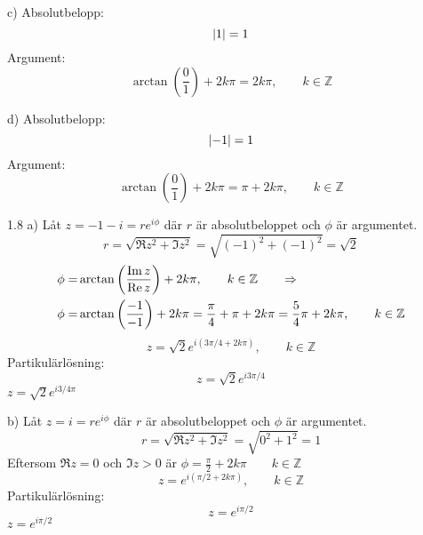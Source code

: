 \begin{task}{c)}
	Absolutbelopp:
	\[\left|1\right|=1\]
	Argument:
	\[\arctan\left(\frac{0}{1}\right)+2k\pi=2k\pi, \qquad k\in\mathbb{Z}\]
\end{task}

\begin{task}{d)}
	Absolutbelopp:
	\[\left|-1\right|=1\]
	Argument:
	\[\arctan\left(\frac{0}{1}\right)+2k\pi=\pi+2k\pi, \qquad k\in\mathbb{Z}\]
\end{task}

\begin{task}{1.8 a)}
	Låt $z = -1-i = re^{i\phi}$ där $r$ är absolutbeloppet och $\phi$ är argumentet.
	\[r=\sqrt{\Re z^2+\Im z^2}=
	\sqrt{(-1)^2+(-1)^2}=
	\sqrt{2}\]
	\begin{align*}
		\phi=&\arctan\left(\frac{\operatorname{Im} z}{\operatorname{Re} z}\right)+2k\pi, \qquad k \in \mathbb{Z} \qquad \operatorname{\Rightarrow} \\
		\phi=&\arctan\left(\frac{-1}{-1}\right)+2k\pi=
		\frac{\pi}{4}+\pi+2k\pi=
		\frac{5}{4}\pi+2k\pi, \qquad k \in \mathbb{Z}
	\end{align*}
	\[z=\sqrt{2}e^{i(3\pi/4+2k\pi)}, \qquad k \in \mathbb{Z}\]
	Partikulärlösning:
	\[z=\sqrt{2}e^{i3\pi/4}\]
	\ans $z=\sqrt{2}e^{i3/4\pi}$
\end{task}

\begin{task}{b)}
	Låt $z = i = re^{i\phi}$ där $r$ är absolutbeloppet och $\phi$ är argumentet.
	\[r=\sqrt{\Re z^2+\Im z^2}=
	\sqrt{0^2+1^2}=
	1\]
	Eftersom $\Re z = 0$ och $\Im z > 0$ är $\phi=\frac{\pi}{2} + 2k\pi \qquad k \in \mathbb{Z}$
	\[z=e^{i(\pi/2+2k\pi)}, \qquad k \in \mathbb{Z}\]
	Partikulärlösning:
	\[z=e^{i\pi/2}\]
	\ans $z=e^{i\pi/2}$
\end{task}